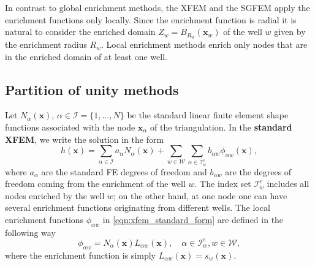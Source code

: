 \documentclass{elsarticle}
\def\vc#1{\mathbf{\boldsymbol{#1}}}     %
\newcommand{\bx}{\vc{x}}
\begin{document}
In contrast to global enrichment methods, the XFEM and the SGFEM apply the enrichment functions only locally. 
Since the enrichment function is radial it is natural to consider the enriched domain $Z_w = B_{R_w}(\vc x_w)$
of the well $w$ given by the enrichment radius $R_w$. Local enrichment methods enrich only 
nodes that are in the enriched domain of at least one well.

\subsection{Partition of unity methods}
\label{sec:pum_methods}
Let $N_\alpha(\bx)$, $\alpha\in\mathcal{I}=\{1,\ldots,N\}$ be the standard linear finite element shape 
functions associated with the node $\bx_\alpha$ of the triangulation. 
In the \textbf{standard XFEM}, we write the solution in the form
\begin{equation} \label{eqn:xfem_standard_form}
  h(\bx) = \sum_{\alpha\in\mathcal{I}}a_\alpha N_\alpha(\bx)
    + \sum_{w\in\mathcal{W}} \sum_{\alpha\in\mathcal{I}^e_w} b_{\alpha w} \phi_{\alpha w}(\bx),
\end{equation}
where $a_\alpha$ are the standard FE degrees of freedom and $b_{\alpha w}$ are the degrees of freedom coming from
the enrichment of the well $w$. The index set $\mathcal{I}^e_w$ includes all nodes enriched by the well $w$; on the other hand, 
at one node one can have several enrichment functions originating from different wells.
The local enrichment functions $\phi_{\alpha w}$ in \eqref{eqn:xfem_standard_form} are defined
in the following way
\begin{equation} \label{eqn:xfem_enrich}
    \phi_{\alpha w} = N_\alpha(\bx)L_{\alpha w}(\bx), \quad \alpha\in\mathcal{I}^e_w, w\in\mathcal{W},
\end{equation}
where the enrichment function is simply $L_{\alpha w}(\bx) = s_w(\bx)$.
\end{document}
